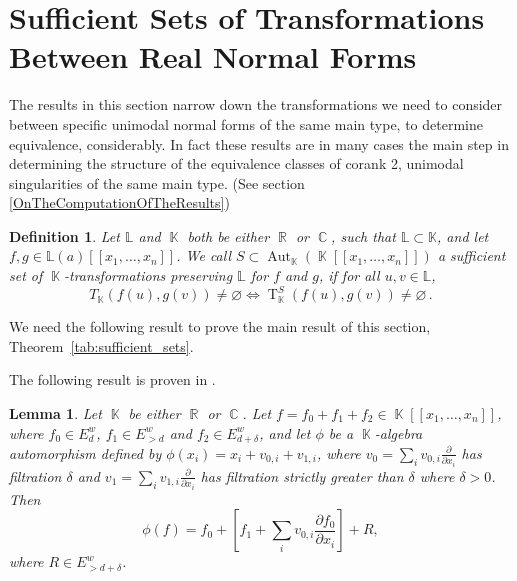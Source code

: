 \documentclass[noend]{amsproc}
\newtheorem{defn}[theorem]{Definition}
\newtheorem{lemma}[theorem]{Lemma}
\theoremstyle{definition}
\DeclareMathOperator{\R}{\mathbb{R}}
\DeclareMathOperator{\C}{\mathbb{C}}
\DeclareMathOperator{\K}{\mathbb{K}}
\DeclareMathOperator{\T}{T}
\DeclareMathOperator{\Aut}{Aut}
\begin{document}
\section{Sufficient Sets of Transformations Between Real Normal Forms}
The results in this section narrow down the transformations we need to consider between specific unimodal normal forms of the same main type, to determine equivalence, considerably. In fact these results are in many cases the main step in determining the structure of the equivalence classes of corank 2, unimodal singularities of the same main type. (See section \ref{OnTheComputationOfTheResults})


\begin{defn}
Let $\mathbb L$ and $\K$ both be either $\R$ or $\C$, such that $\mathbb L\subset\mathbb K$, and let $f,g\in\mathbb L(a)[[x_1,\ldots,x_n]]$. We call $S\subset \Aut_{\K}(\K[[x_1,\ldots,x_n]])$ a sufficient set of $\K$-transformations preserving $\mathbb L$ for $f$ and $g$, if for all $u,v\in\mathbb L$,  
\[T_{\K}(f(u),g(v))\neq\varnothing\Leftrightarrow \T_{\K}^S(f(u),g(v))\neq\varnothing\,.\]
\end{defn}
We need the following result to prove the main result of this section, Theorem~\ref{tab:sufficient_sets}.

The following result is proven in \cite{A1975}.
\begin{lemma}\label{vectorlemma}
Let $\K$ be either $\R$ or $\C$. Let $f=f_0+f_1+f_2\in\K[[x_1,\ldots,x_n]]$, where $f_0\in E^w_d$, $f_1\in E^w_{>d}$ and $f_2\in E^w_{d+\delta}$, and let $\phi$ be a $\K$-algebra automorphism defined by $\phi(x_i)=x_i+v_{0,i}+v_{1,i}$, where $v_0=\sum_iv_{0,i}\frac{\partial}{\partial x_i}$ has filtration $\delta$ and $v_1=\sum_iv_{1,i}\frac{\partial}{\partial x_i}$ has filtration strictly greater than $\delta$ where $\delta>0$. Then
\[\phi(f)=f_0+\left[ f_1+\sum_iv_{0,i}\frac{\partial f_0}{\partial x_i}\right]+R,\]
where $R\in E^w_{>d+\delta}$.
\end{lemma}
\end{document}
